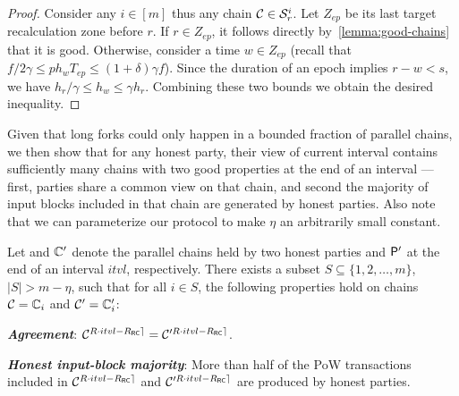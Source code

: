 \begin{proof}
    Consider any $i \in [m]$ thus any chain $\mathcal{C} \in \mathcal{S}^i_r$.
    Let $Z_{ep}$ be its last target recalculation zone before $r$.
    If $r \in Z_{ep}$, it follows directly by~\cref{lemma:good-chains} that it is good.
    Otherwise, consider a time $w \in Z_{ep}$ (recall that $f /2\gamma \le p h_w T_{ep} \le (1 + \delta) \gamma f$).
    Since the duration of an epoch implies $r - w < s$, we have $h_r / \gamma \le h_w \le \gamma h_r$.
    Combining these two bounds we obtain the desired inequality.
\end{proof}

Given that long forks could only happen in a bounded fraction of parallel chains, we then show that for any honest party, their view of current interval contains sufficiently many chains with two good properties at the end of an interval --- first, parties share a common view on that chain, and second the majority of input blocks included in that chain are generated by honest parties.
%
Also note that we can parameterize our protocol to make $\eta$ an arbitrarily small constant.

\begin{theorem} \label{thm:interval-oblivious-agreement}
    Let \parallelChains and $\mathbb{C}'$ denote the parallel chains held by two honest parties \party and $\mathsf{P}'$ at the end of an interval $itvl$, respectively.
    There exists a subset $S \subseteq \{1, 2, \ldots, m \}$, $|S| > m - \eta$, such that for all $i \in S$, the following properties hold on chains $\mathcal{C} = \mathbb{C}_i$ and $\mathcal{C}' = \mathbb{C}'_i$:
    \begin{cccItemize}[nosep]
        \item \emph{\bf Agreement}: $\mathcal{C}^{{R \cdot itvl - R_{\mathsf{RC}}}\rceil} = \mathcal{C}'^{{R \cdot itvl - R_{\mathsf{RC}}}\rceil}$.

        \item \emph{\bf Honest input-block majority}: More than half of the PoW transactions included in $\mathcal{C}^{{R \cdot itvl - R_{\mathsf{RC}}}\rceil}$ and $\mathcal{C}'^{{R \cdot itvl - R_{\mathsf{RC}}}\rceil}$ are produced by honest parties.
    \end{cccItemize}
\end{theorem}

